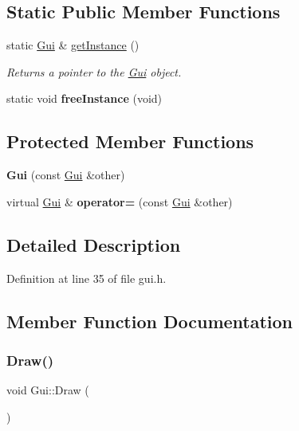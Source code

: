 \subsection*{Static Public Member Functions}
\begin{DoxyCompactItemize}
\item 
static \hyperlink{class_gui}{Gui} \& \hyperlink{class_gui_a613c787488c374d68a04886cc63127a7}{get\+Instance} ()
\begin{DoxyCompactList}\small\item\em Returns a pointer to the \hyperlink{class_gui}{Gui} object. \end{DoxyCompactList}\item 
\mbox{\label{class_gui_a900f9430f39f25922dd9c08d6853fa83}} 
static void {\bfseries free\+Instance} (void)
\end{DoxyCompactItemize}
\subsection*{Protected Member Functions}
\begin{DoxyCompactItemize}
\item 
\mbox{\label{class_gui_a6e03ddcbaab0496911208f41c8c02ea3}} 
{\bfseries Gui} (const \hyperlink{class_gui}{Gui} \&other)
\item 
\mbox{\label{class_gui_a2babe9aa24b2538a5c2b243cd88912ba}} 
virtual \hyperlink{class_gui}{Gui} \& {\bfseries operator=} (const \hyperlink{class_gui}{Gui} \&other)
\end{DoxyCompactItemize}


\subsection{Detailed Description}


Definition at line 35 of file gui.\+h.



\subsection{Member Function Documentation}
\mbox{\label{class_gui_acf4f1d3954d40aec3bc0ab4652b6a060}} 
\subsubsection{\texorpdfstring{Draw()}{Draw()}}
{\footnotesize\ttfamily void Gui\+::\+Draw (\begin{DoxyParamCaption}{ }\end{DoxyParamCaption})}



